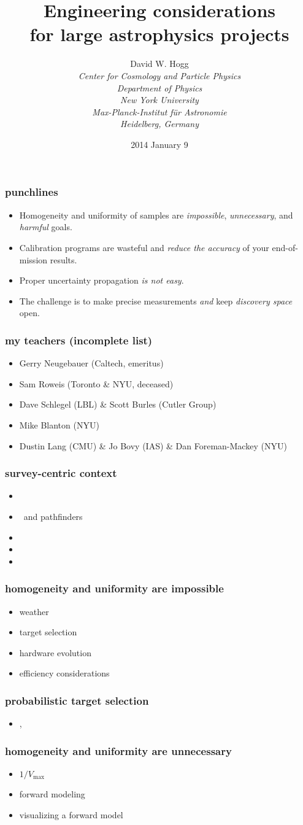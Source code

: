 \documentclass[pdftex]{beamer}
\title{Engineering considerations\\ for large astrophysics projects}
\author[David W. Hogg (NYU)]{David W. Hogg \\[1ex]
  \textsl{\small Center for Cosmology and Particle Physics\\
                 Department of Physics\\
                 New York University\\[1ex]
                 Max-Planck-Institut f\"ur Astronomie\\
                 Heidelberg, Germany}}
\date{2014 January 9}
\newcommand{\conclusionslide}{
\begin{frame}
  \frametitle{punchlines}
  \begin{itemize}
  \item Homogeneity and uniformity of samples are \emph{impossible}, \emph{unnecessary}, and \emph{harmful} goals.
  \item Calibration programs are wasteful and \emph{reduce the accuracy} of your end-of-mission results.
  \item Proper uncertainty propagation \emph{is not easy}.
  \item The challenge is to make precise measurements \emph{and} keep \emph{discovery space} open.
  \end{itemize}
\end{frame}
}
\begin{document}
\begin{frame}
  \titlepage
\end{frame}

\conclusionslide

\begin{frame}
  \frametitle{my teachers (incomplete list)}
  \begin{itemize}
  \item Gerry Neugebauer (Caltech, emeritus)
  \item Sam Roweis (Toronto \& NYU, deceased)
  \item Dave Schlegel (LBL) \& Scott Burles (Cutler Group)
  \item Mike Blanton (NYU)
  \item Dustin Lang (CMU) \& Jo Bovy (IAS) \& Dan Foreman-Mackey (NYU)
  \end{itemize}
\end{frame}

\begin{frame}
  \frametitle{survey-centric context}
  \begin{itemize}
  \item \gaia
  \item \ska\ and pathfinders
  \item \euclid
  \item \lsst
  \item \sdssiv
  \end{itemize}
\end{frame}

\begin{frame}
  \frametitle{homogeneity and uniformity are impossible}
  \begin{itemize}
  \item weather
  \item target selection
  \item hardware evolution
  \item efficiency considerations
  \end{itemize}
\end{frame}

\begin{frame}
  \frametitle{probabilistic target selection}
  \begin{itemize}
  \item \sdssiii, \sdssiv
  \end{itemize}
\end{frame}

\begin{frame}
  \frametitle{homogeneity and uniformity are unnecessary}
  \begin{itemize}
  \item $1 / V_{\mathrm{max}}$
  \item forward modeling
  \item visualizing a forward model
  \end{itemize}
\end{frame}
\end{document}
